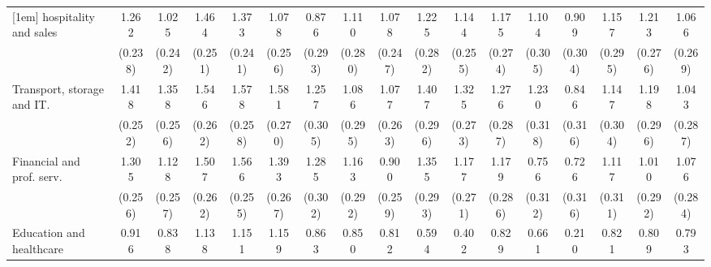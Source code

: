 {\begin{tabular}{l*{16}{c}}
[1em]
hospitality and sales&       1.262\sym{***}&       1.025\sym{***}&       1.464\sym{***}&       1.373\sym{***}&       1.078\sym{***}&       0.876\sym{**} &       1.110\sym{***}&       1.078\sym{***}&       1.225\sym{***}&       1.144\sym{***}&       1.175\sym{***}&       1.104\sym{***}&       0.909\sym{**} &       1.157\sym{***}&       1.213\sym{***}&       1.066\sym{***}\\
                    &     (0.238)         &     (0.242)         &     (0.251)         &     (0.241)         &     (0.256)         &     (0.293)         &     (0.280)         &     (0.247)         &     (0.282)         &     (0.255)         &     (0.274)         &     (0.305)         &     (0.304)         &     (0.295)         &     (0.276)         &     (0.269)         \\
[1em]
Transport, storage and IT.&       1.418\sym{***}&       1.358\sym{***}&       1.546\sym{***}&       1.578\sym{***}&       1.581\sym{***}&       1.257\sym{***}&       1.086\sym{***}&       1.077\sym{***}&       1.407\sym{***}&       1.325\sym{***}&       1.276\sym{***}&       1.230\sym{***}&       0.846\sym{**} &       1.147\sym{***}&       1.198\sym{***}&       1.043\sym{***}\\
                    &     (0.252)         &     (0.256)         &     (0.262)         &     (0.258)         &     (0.270)         &     (0.305)         &     (0.295)         &     (0.263)         &     (0.296)         &     (0.273)         &     (0.287)         &     (0.318)         &     (0.316)         &     (0.304)         &     (0.296)         &     (0.287)         \\
[1em]
Financial and prof. serv.&       1.305\sym{***}&       1.128\sym{***}&       1.507\sym{***}&       1.566\sym{***}&       1.393\sym{***}&       1.285\sym{***}&       1.163\sym{***}&       0.900\sym{***}&       1.355\sym{***}&       1.177\sym{***}&       1.179\sym{***}&       0.756\sym{*}  &       0.726\sym{*}  &       1.117\sym{***}&       1.010\sym{***}&       1.076\sym{***}\\
                    &     (0.256)         &     (0.257)         &     (0.262)         &     (0.255)         &     (0.267)         &     (0.302)         &     (0.292)         &     (0.259)         &     (0.293)         &     (0.271)         &     (0.286)         &     (0.312)         &     (0.316)         &     (0.311)         &     (0.292)         &     (0.284)         \\
[1em]
Education and healthcare&       0.916\sym{***}&       0.838\sym{**} &       1.138\sym{***}&       1.151\sym{***}&       1.159\sym{***}&       0.863\sym{**} &       0.850\sym{**} &       0.812\sym{**} &       0.594         &       0.402         &       0.829\sym{*}  &       0.661         &       0.210         &       0.821\sym{*}  &       0.809\sym{*}  &       0.793\sym{*}  \\

\end{tabular}}
